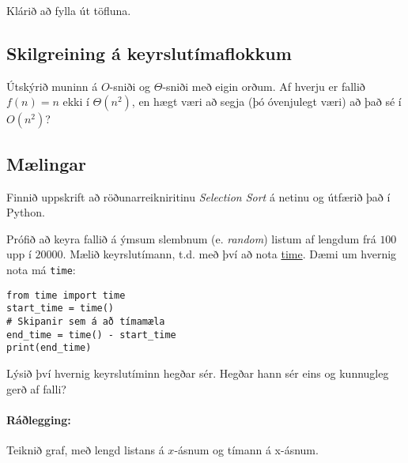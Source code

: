 \documentclass{article}
\begin{document}
Klárið að fylla út töfluna.

\subsection{Skilgreining á keyrslutímaflokkum}
Útskýrið muninn á $O$-sniði og $\Theta$-sniði með eigin orðum. Af hverju er fallið $f(n) = n$ ekki í $\Theta(n^2)$, en hægt væri að segja (þó óvenjulegt væri) að það sé í $O(n^2)$?

\subsection{Mælingar}
Finnið uppskrift að röðunarreikniritinu \emph{Selection Sort} á netinu og útfærið það í Python.

Prófið að keyra fallið á ýmsum slembnum (e. \emph{random}) listum af lengdum frá $100$ upp í $20000$. Mælið keyrslutímann, t.d. með því að nota \href{https://docs.python.org/3.5/library/time.html}{time}. Dæmi um hvernig nota má \texttt{time}:

\begin{verbatim}
from time import time
start_time = time()
# Skipanir sem á að tímamæla
end_time = time() - start_time
print(end_time)
\end{verbatim}

Lýsið því hvernig keyrslutíminn hegðar sér. Hegðar hann sér eins og kunnugleg gerð af falli?

\paragraph{Ráðlegging:} Teiknið graf, með lengd listans á $x$-ásnum og tímann á x-ásnum.
\end{document}
